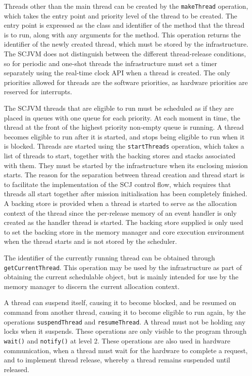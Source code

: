 Threads other than the main thread can be created by the
\texttt{makeThread} operation, which takes the entry point and
priority level of the thread to be created.
The entry point is expressed as the class and identifier of the method
that the thread is to run, along with any arguments for the method.
This operation returns the identifier of the newly created thread,
which must be stored by the infrastructure.
The SCJVM does not distinguish between the different thread-release
conditions, so for periodic and one-shot threads the infrastructure
must set a timer separately using the real-time clock API when a
thread is created.
The only priorities allowed for threads are the software priorities,
as hardware priorities are reserved for interrupts.

The SCJVM threads that are eligible to run must be scheduled as if
they are placed in queues with one queue for each priority.
At each moment in time, the thread at the front of the highest
priority non-empty queue is running.
A thread becomes eligible to run after it is started, and stops being
eligible to run when it is blocked.
Threads are started using the \texttt{start\-Threads} operation, which
takes a list of threads to start, together with the backing stores and
stacks associated with them.
They must be started by the infrastructure when its enclosing mission
starts.
The reason for the separation between thread creation and thread start
is to facilitate the implementation of the SCJ control flow, which
requires that threads all start together after mission initialisation
has been completely finished.
A backing store is provided when a thread is started to serve as the
allocation context of the thread since the per-release memory of an
event handler is only created as the handler thread is started.
The backing store supplied is only used to set the backing store in
the memory manager and core execution environment when the thread
starts and is not stored by the scheduler.

The identifier of the currently running thread can be obtained through
\texttt{get\-Current\-Thread}.
This operation may be used by the infrastructure as part of obtaining
the current schedulable object, but is mainly intended for use by the
memory manager to discern the current allocation context.

A thread can suspend itself, causing it to become blocked, and be
resumed on command from another thread, causing it to become eligible
to run again, by the operations \texttt{suspend\-Thread} and
\texttt{resume\-Thread}.
A thread must not be holding any locks when it suspends.
These operations are only visible to the program through
\texttt{wait()} and \texttt{notify()} at level 2.
These operations are also used in hardware communication, when a
thread must wait for the hardware to complete a request, and to
implement thread release, whereby a thread remains suspended until
released.

